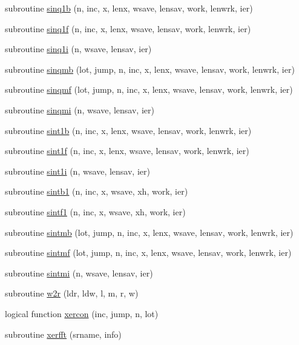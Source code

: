 \begin{DoxyCompactItemize}
\item 
subroutine \mbox{\hyperlink{namespacefftclass_a6770a2a0c7bdf09af5ed719175fb4ca4}{sinq1b}} (n, inc, x, lenx, wsave, lensav, work, lenwrk, ier)
\item 
subroutine \mbox{\hyperlink{namespacefftclass_a205d9dc43dfb082cdee420a4ae2fb269}{sinq1f}} (n, inc, x, lenx, wsave, lensav, work, lenwrk, ier)
\item 
subroutine \mbox{\hyperlink{namespacefftclass_aa0d2ffdfc38a79ecd1b47de75f3d1084}{sinq1i}} (n, wsave, lensav, ier)
\item 
subroutine \mbox{\hyperlink{namespacefftclass_aa7e7e40b824e045f452a09a2e7abf333}{sinqmb}} (lot, jump, n, inc, x, lenx, wsave, lensav, work, lenwrk, ier)
\item 
subroutine \mbox{\hyperlink{namespacefftclass_ae56c7f24f27f2fb48f15359441b5e82f}{sinqmf}} (lot, jump, n, inc, x, lenx, wsave, lensav, work, lenwrk, ier)
\item 
subroutine \mbox{\hyperlink{namespacefftclass_a642a9e3f241f3aaa6baf58741d4cdd3b}{sinqmi}} (n, wsave, lensav, ier)
\item 
subroutine \mbox{\hyperlink{namespacefftclass_ada18e37204cdb55b83be98eaecc27730}{sint1b}} (n, inc, x, lenx, wsave, lensav, work, lenwrk, ier)
\item 
subroutine \mbox{\hyperlink{namespacefftclass_a6ae22ff215b2e962b410eb1b9c4860d7}{sint1f}} (n, inc, x, lenx, wsave, lensav, work, lenwrk, ier)
\item 
subroutine \mbox{\hyperlink{namespacefftclass_ae156ccdcf953af967a42d20df0ddb725}{sint1i}} (n, wsave, lensav, ier)
\item 
subroutine \mbox{\hyperlink{namespacefftclass_af29f41f086c8e8901df2716d0b86db20}{sintb1}} (n, inc, x, wsave, xh, work, ier)
\item 
subroutine \mbox{\hyperlink{namespacefftclass_aa79de4b10a068408990ac9ac8f32d134}{sintf1}} (n, inc, x, wsave, xh, work, ier)
\item 
subroutine \mbox{\hyperlink{namespacefftclass_a4d9b6f96810b5b7a8b7dd38af74f5b55}{sintmb}} (lot, jump, n, inc, x, lenx, wsave, lensav, work, lenwrk, ier)
\item 
subroutine \mbox{\hyperlink{namespacefftclass_a497c6a39bac7daa7973b53cb00ffd6c3}{sintmf}} (lot, jump, n, inc, x, lenx, wsave, lensav, work, lenwrk, ier)
\item 
subroutine \mbox{\hyperlink{namespacefftclass_a9b28ecda04690fe2a4425da2b5625e4d}{sintmi}} (n, wsave, lensav, ier)
\item 
subroutine \mbox{\hyperlink{namespacefftclass_af191171f5e31fbad6c0e224faaf6175e}{w2r}} (ldr, ldw, l, m, r, w)
\item 
logical function \mbox{\hyperlink{namespacefftclass_a16b89da06cf17773f6b5aec6883952c2}{xercon}} (inc, jump, n, lot)
\item 
subroutine \mbox{\hyperlink{namespacefftclass_a3e1884f0fa20142f45f2d3efe3246adc}{xerfft}} (srname, info)
\end{DoxyCompactItemize}


